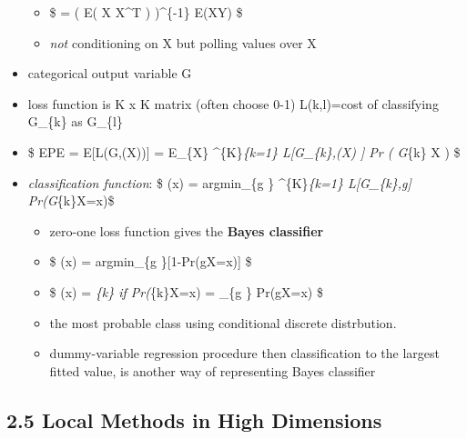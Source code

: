 \documentclass[11pt]{article}
\providecommand{\tightlist}{%
      \setlength{\itemsep}{0pt}\setlength{\parskip}{0pt}}
\begin{document}
\begin{itemize}
  \begin{itemize}
  \tightlist
  \item
    \$ \beta = ( E( X X\^{}T ) )\^{}\{-1\} E(XY) \$
  \item
    \emph{not} conditioning on X but polling values over X
  \end{itemize}
\item
  categorical output variable G
\item
  loss function is K x K matrix (often choose 0-1) L(k,l)=cost of
  classifying G\_\{k\} as G\_\{l\}
\item
  \$ EPE = E{[}L(G,(X)){]} = E\_\{X\}
  \Sigma\^{}\{K\}\emph{\{k=1\} L{[}G\_\{k\},(X) {]} Pr ( G}\{k\}
  \textbar{} X ) \$
\item
  \emph{classification function}: \$ (x) = argmin\_\{g
  \in {} \} \Sigma\^{}\{K\}\emph{\{k=1\} L{[}G\_\{k\},g{]}
  Pr(G}\{k\}\textbar{}X=x)\$

  \begin{itemize}
  \tightlist
  \item
    zero-one loss function gives the \textbf{Bayes classifier}
  \item
    \$ (x) = argmin\_\{g
    \in {}\}{[}1-Pr(g\textbar{}X=x){]} \$
  \item
    \$ (x) = \emph{\{k\} if
    Pr(}\{k\}\textbar{}X=x) = \max\_\{g \in {}\}
    Pr(g\textbar{}X=x) \$
  \item
    the most probable class using conditional discrete distrbution.
  \item
    dummy-variable regression procedure then classification to the
    largest fitted value, is another way of representing Bayes
    classifier
  \end{itemize}
\end{itemize}

\subsection{2.5 Local Methods in High
Dimensions}\label{local-methods-in-high-dimensions}
\end{document}

